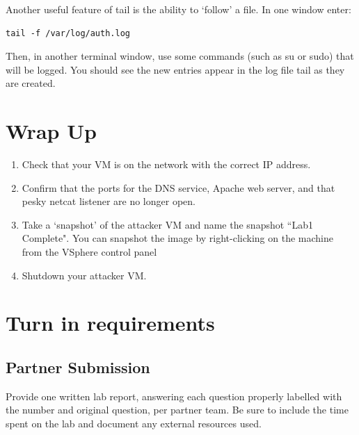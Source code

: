 \documentclass{article}
\begin{document}
\medskip

Another useful feature of tail is the ability to ‘follow’ a file. In one window enter:
\begin{verbatim}
tail -f /var/log/auth.log
\end{verbatim}

Then, in another terminal window, use some commands (such as su or sudo) that will be logged. You should see the new entries appear in the log file tail as they are created.

\section{Wrap Up}
\begin{enumerate}
\item Check that your VM is on the network with the correct IP address.
\item Confirm that the ports for the DNS service, Apache web server, and that pesky netcat listener are no longer open.
\item Take a `snapshot' of the attacker VM and name the snapshot ``Lab1 Complete". You can snapshot the image by right-clicking on the machine from the VSphere control panel
\item Shutdown your attacker VM.
\end{enumerate}

\section{Turn in requirements}
\subsection{Partner Submission}
Provide one written lab report, answering each question properly labelled with the number and original question, per partner team. Be sure to include the time spent on the lab and document any external resources used. 
\end{document}
